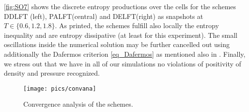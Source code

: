	
	 \cref{fig:SO7} shows the discrete entropy productions over the cells for the schemes 
	  DDLFT (left), PALFT(central) and DELFT(right) as snapshots at $T \in \{0.6, 1.2, 1.8\}$. %
	As printed, the schemes fulfill also locally the entropy inequality and are entropy dissipative (at least for this experiment). %
The small oscillations inside the numerical solution may be further cancelled out using additionally the Dafermos criterion \cref{eq_Dafermos} as mentioned also in \cite{klein2021using}.
Finally, we stress out that we have in all of our  simulations  no violations of positivity of density and pressure recognized. 
	\begin{figure}
	\begin{center}
		\texttt{[image: pics/convana]}
		\caption{Convergence analysis of the schemes.}
		\label{fig:CA}
		\end{center}
	\end{figure}
	
